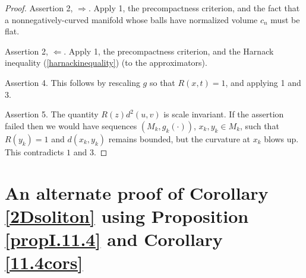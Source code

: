 \begin{proof}
\bigskip
Assertion 2, $\Longrightarrow$.  Apply 1,
the precompactness criterion, and the fact
that a nonnegatively-curved manifold whose balls
have normalized volume $c_n$ must be flat.

\bigskip
Assertion 2, $\Longleftarrow$. Apply 1, the precompactness criterion,
and the Harnack inequality (\ref{harnackinequality}) (to the approximators).

\bigskip
Assertion 4.  This follows by rescaling $g$ so that $R(x,t)=1$, and
applying 1 and 3.

\bigskip
Assertion 5.  The quantity $R(z)d^2(u,v)$ is scale invariant.
If the assertion failed then  we would have sequences $(M_k,g_k(\cdot))$,
$x_k,y_k\in M_k$, such that $R(y_k)=1$ and
$d(x_k,y_k)$ remains bounded, but the curvature at $x_k$ blows up.
This contradicts $1$ and $3$.

\end{proof}

\section{An alternate proof of Corollary \ref{2Dsoliton}
using Proposition \ref{propI.11.4} and Corollary \ref{11.4cors}}
\label{altpf11.3}

